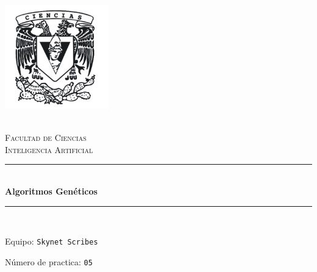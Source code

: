 \begin{titlepage}
\center 
\newcommand{\HRule}{\rule{\linewidth}{0.5mm}} 

\includegraphics[width=4.5cm]{IMA/cienciasWhite.png}

\quad \\[0.2cm]
\textsc{\huge Facultad de Ciencias}\\[.6cm] 
\textsc{\huge Inteligencia Artificial}\\[0.5cm]

\makeatletter
    \HRule \\ [0.4cm]
        { \huge \bfseries Algoritmos Genéticos}\\
    \HRule \\ [0.4cm]
    
\vspace{2mm}

\begin{flushleft}
    \Large{Equipo:} \texttt{\Large Skynet Scribes}
\end{flushleft}
\begin{flushleft}
    \Large{Número de practica:} \texttt{\Large 05}\\[0.8cm]
\end{flushleft}


\begin{minipage}{0.8\textwidth}
    \begin{flushright}
            
    \end{flushright}
\end{minipage}    


\end{titlepage}
